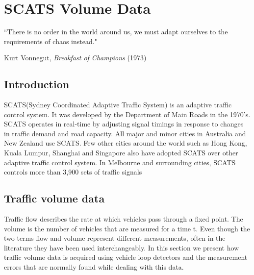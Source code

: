 
\chapter{SCATS Volume Data} %

\label{Chapter3}


``There is no order in the world around us, we must adapt ourselves to the requirements of chaos
instead."

\begin{flushright}
Kurt Vonnegut, \textit{Breakfast of Champions} (1973)
\end{flushright}

\section{Introduction}
SCATS(Sydney Coordinated Adaptive Traffic System) is an adaptive traffic control system. It was
developed by the Department of Main Roads in the 1970's. SCATS operates in real-time by adjusting
signal timings in response to changes in traffic demand and road capacity. All major and minor
cities in Australia and New Zealand use SCATS. Few other cities around the world such as Hong
Kong, Kuala Lumpur, Shanghai and Singapore also have adopted SCATS over other adaptive traffic
control system. In Melbourne and surrounding cities, SCATS controls more than 3,900 sets of traffic
signals


\section{Traffic volume data}
Traffic flow describes the rate at which vehicles pass through a fixed point. The volume is the number
of vehicles that are measured for a time t. Even though the two terms flow and volume represent different
measurements, often in the literature they have been used interchangeably. In this section we present
how traffic volume data is acquired using vehicle loop detectors and the measurement errors that are
normally found while dealing with this data.

